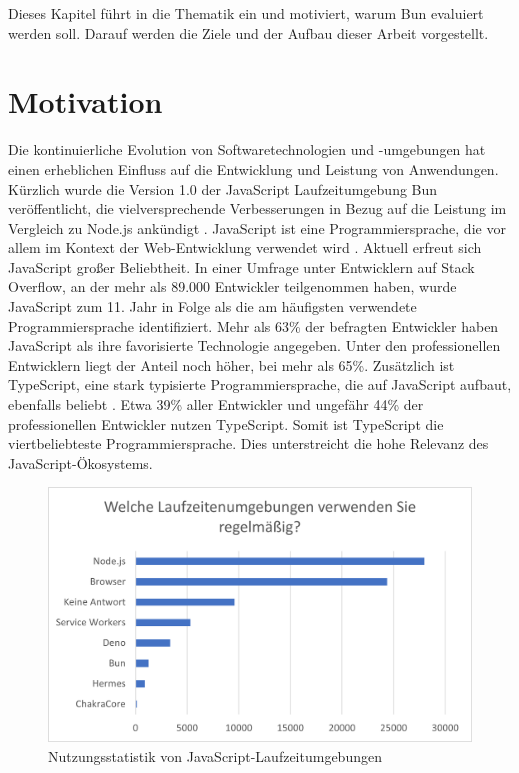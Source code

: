\pagestyle{fancy-style}
 \label{introduction}
Dieses Kapitel führt in die Thematik ein und motiviert, warum Bun evaluiert werden soll. Darauf werden die Ziele und der Aufbau dieser Arbeit vorgestellt.

\section{Motivation} \label{sec:introduction-motivation}
Die kontinuierliche Evolution von Softwaretechnologien und -umgebungen hat einen erheblichen Einfluss auf die Entwicklung und Leistung von Anwendungen. Kürzlich wurde die Version 1.0 der JavaScript Laufzeitumgebung Bun veröffentlicht, die vielversprechende Verbesserungen in Bezug auf die Leistung im Vergleich zu Node.js ankündigt \cite{Sumner.2023}. \newline
JavaScript ist eine Programmiersprache, die vor allem im Kontext der Web-Entwicklung verwendet wird \cite{Brown.November2019}. Aktuell erfreut sich JavaScript großer Beliebtheit. In einer Umfrage unter Entwicklern auf Stack Overflow, an der mehr als 89.000 Entwickler teilgenommen haben, wurde JavaScript zum 11. Jahr in Folge als die am häufigsten verwendete Programmiersprache identifiziert. Mehr als 63\% der befragten Entwickler haben JavaScript als ihre favorisierte Technologie angegeben. Unter den professionellen Entwicklern liegt der Anteil noch höher, bei mehr als 65\%. Zusätzlich ist TypeScript, eine stark typisierte Programmiersprache, die auf 
JavaScript aufbaut, ebenfalls beliebt \cite{Microsoft.o.J.}. Etwa 39\% aller Entwickler und ungefähr 44\% der professionellen Entwickler nutzen TypeScript. Somit ist TypeScript die viertbeliebteste Programmiersprache. \cite{StackOverflow.2023} Dies unterstreicht die hohe Relevanz des JavaScript-Ökosystems.\\

\begin{figure}[h]
	\centering
	\includegraphics[width=\linewidth]{./images/WhichRuntimesDoYouUseRegularly}
	\caption[Nutzungsstatistik von JavaScript-Laufzeitumgebungen]{Nutzungsstatistik von JavaScript-Laufzeitumgebungen \cite{Greif.2022}}
	\label{fig:runtime-share}
\end{figure}

